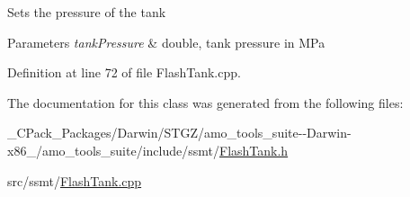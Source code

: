 Sets the pressure of the tank 
\begin{DoxyParams}{Parameters}
{\em tank\+Pressure} & double, tank pressure in M\+Pa \\
\hline
\end{DoxyParams}


Definition at line 72 of file Flash\+Tank.\+cpp.



The documentation for this class was generated from the following files\+:\begin{DoxyCompactItemize}
\item 
\+\_\+\+C\+Pack\+\_\+\+Packages/\+Darwin/\+S\+T\+G\+Z/amo\+\_\+tools\+\_\+suite-\/-\/\+Darwin-\/x86\+\_/amo\+\_\+tools\+\_\+suite/include/ssmt/\hyperlink{___c_pack___packages_2_darwin_2_s_t_g_z_2amo__tools__suite--_darwin-x86__64_2amo__tools__suite_2include_2ssmt_2_flash_tank_8h}{Flash\+Tank.\+h}\item 
src/ssmt/\hyperlink{_flash_tank_8cpp}{Flash\+Tank.\+cpp}\end{DoxyCompactItemize}
